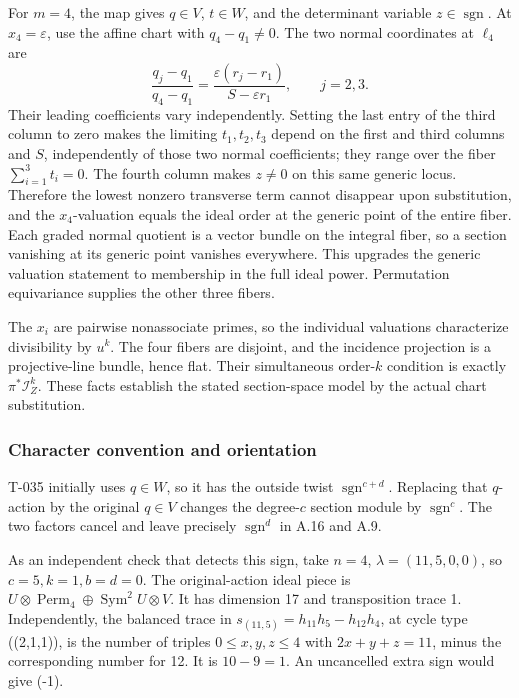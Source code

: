 \documentclass[
  10pt,
]{article}
\begin{document}
For \(m=4\), the map gives \(q\in V\), \(t\in W\), and the determinant
variable \(z\in\operatorname{sgn}\). At \(x_4=\varepsilon\), use the
affine chart with \(q_4-q_1\ne0\). The two normal coordinates at
\(\ell_4\) are \[
\frac{q_j-q_1}{q_4-q_1}
=\frac{\varepsilon(r_j-r_1)}{S-\varepsilon r_1},\qquad j=2,3.
\] Their leading coefficients vary independently. Setting the last entry
of the third column to zero makes the limiting \(t_1,t_2,t_3\) depend on
the first and third columns and \(S\), independently of those two normal
coefficients; they range over the fiber \(\sum_{i=1}^3t_i=0\). The
fourth column makes \(z\ne0\) on this same generic locus. Therefore the
lowest nonzero transverse term cannot disappear upon substitution, and
the \(x_4\)-valuation equals the ideal order at the generic point of the
entire fiber. Each graded normal quotient is a vector bundle on the
integral fiber, so a section vanishing at its generic point vanishes
everywhere. This upgrades the generic valuation statement to membership
in the full ideal power. Permutation equivariance supplies the other
three fibers.

The \(x_i\) are pairwise nonassociate primes, so the individual
valuations characterize divisibility by \(u^k\). The four fibers are
disjoint, and the incidence projection is a projective-line bundle,
hence flat. Their simultaneous order-\(k\) condition is exactly
\(\pi^*\mathcal I_Z^k\). These facts establish the stated section-space
model by the actual chart substitution.

\subsubsection{Character convention and
orientation}\label{character-convention-and-orientation}

T-035 initially uses \(q\in W\), so it has the outside twist
\(\operatorname{sgn}^{c+d}\). Replacing that \(q\)-action by the
original \(q\in V\) changes the degree-\(c\) section module by
\(\operatorname{sgn}^c\). The two factors cancel and leave precisely
\(\operatorname{sgn}^d\) in A.16 and A.9.

As an independent check that detects this sign, take \(n=4\),
\(\lambda=(11,5,0,0)\), so \(c=5,k=1,b=d=0\). The original-action ideal
piece is
\(U\otimes\operatorname{Perm}_4\oplus\operatorname{Sym}^2U\otimes V\).
It has dimension 17 and transposition trace 1. Independently, the
balanced trace in \(s_{(11,5)}=h_{11}h_5-h_{12}h_4\), at cycle type
((2,1,1)), is the number of triples \(0\le x,y,z\le4\) with
\(2x+y+z=11\), minus the corresponding number for 12. It is \(10-9=1\).
An uncancelled extra sign would give (-1).
\end{document}
